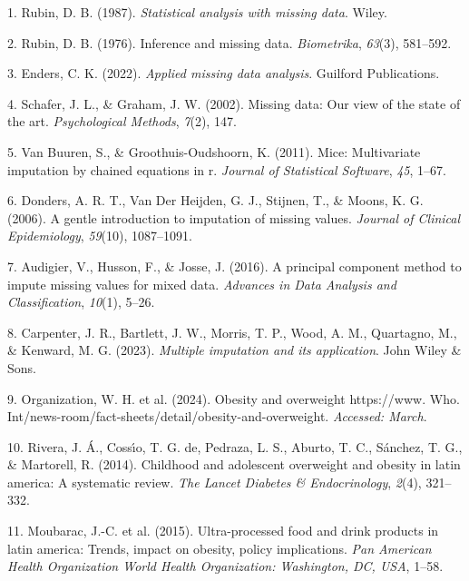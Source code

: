 \documentclass[
  letterpaper,
  DIV=11,
  numbers=noendperiod]{scrartcl}
\newlength{\cslhangindent}
\newenvironment{CSLReferences}[2] %
 {\begin{list}{}{%
  \setlength{\itemindent}{0pt}
  \setlength{\leftmargin}{0pt}
  \setlength{\parsep}{0pt}
  \ifodd #1
   \setlength{\leftmargin}{\cslhangindent}
   \setlength{\itemindent}{-1\cslhangindent}
  \fi
  \setlength{\itemsep}{#2\baselineskip}}}
 {\end{list}}
\begin{document}
\label{refs}
\begin{CSLReferences}{1}{0}
1. Rubin, D. B. (1987). \emph{Statistical analysis with missing data}.
Wiley.

2. Rubin, D. B. (1976). Inference and missing data. \emph{Biometrika},
\emph{63}(3), 581--592.

3. Enders, C. K. (2022). \emph{Applied missing data analysis}. Guilford
Publications.

4. Schafer, J. L., \& Graham, J. W. (2002). Missing data: Our view of
the state of the art. \emph{Psychological Methods}, \emph{7}(2), 147.

5. Van Buuren, S., \& Groothuis-Oudshoorn, K. (2011). Mice: Multivariate
imputation by chained equations in r. \emph{Journal of Statistical
Software}, \emph{45}, 1--67.

6. Donders, A. R. T., Van Der Heijden, G. J., Stijnen, T., \& Moons, K.
G. (2006). A gentle introduction to imputation of missing values.
\emph{Journal of Clinical Epidemiology}, \emph{59}(10), 1087--1091.

7. Audigier, V., Husson, F., \& Josse, J. (2016). A principal component
method to impute missing values for mixed data. \emph{Advances in Data
Analysis and Classification}, \emph{10}(1), 5--26.

8. Carpenter, J. R., Bartlett, J. W., Morris, T. P., Wood, A. M.,
Quartagno, M., \& Kenward, M. G. (2023). \emph{Multiple imputation and
its application}. John Wiley \& Sons.

9. Organization, W. H. et al. (2024). Obesity and overweight
https://www. Who.
Int/news-room/fact-sheets/detail/obesity-and-overweight. \emph{Accessed:
March}.

10. Rivera, J. Á., Cossı́o, T. G. de, Pedraza, L. S., Aburto, T. C.,
Sánchez, T. G., \& Martorell, R. (2014). Childhood and adolescent
overweight and obesity in latin america: A systematic review. \emph{The
Lancet Diabetes \& Endocrinology}, \emph{2}(4), 321--332.

11. Moubarac, J.-C. et al. (2015). Ultra-processed food and drink
products in latin america: Trends, impact on obesity, policy
implications. \emph{Pan American Health Organization World Health
Organization: Washington, DC, USA}, 1--58.


\end{CSLReferences}
\end{document}
